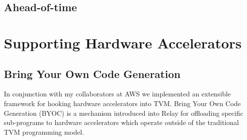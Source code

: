 
\subsection{Ahead-of-time}





\section{Supporting Hardware Accelerators}
\label{sec:accel}

\subsection{Bring Your Own Code Generation}
\label{sec:byoc}

In conjunction with my collaborators at AWS we implemented an
  extensible framework for hooking hardware accelerators into
  TVM.
Bring Your Own Code Generation (BYOC) is a mechanism introduced
  into Relay for offloading specific sub-programs to hardware
  accelerators which operate outside of the traditional TVM
  programming model.

